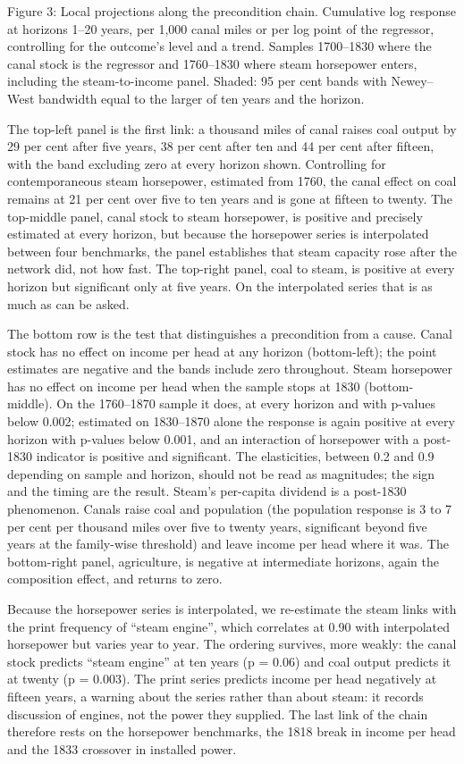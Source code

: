 \documentclass[
  11pt,
]{article}
\begin{document}
Figure 3: Local projections along the precondition chain. Cumulative log
response at horizons 1--20 years, per 1,000 canal miles or per log point
of the regressor, controlling for the outcome's level and a trend.
Samples 1700--1830 where the canal stock is the regressor and 1760--1830
where steam horsepower enters, including the steam-to-income panel.
Shaded: 95 per cent bands with Newey--West bandwidth equal to the larger
of ten years and the horizon.

The top-left panel is the first link: a thousand miles of canal raises
coal output by 29 per cent after five years, 38 per cent after ten and
44 per cent after fifteen, with the band excluding zero at every horizon
shown. Controlling for contemporaneous steam horsepower, estimated from
1760, the canal effect on coal remains at 21 per cent over five to ten
years and is gone at fifteen to twenty. The top-middle panel, canal
stock to steam horsepower, is positive and precisely estimated at every
horizon, but because the horsepower series is interpolated between four
benchmarks, the panel establishes that steam capacity rose after the
network did, not how fast. The top-right panel, coal to steam, is
positive at every horizon but significant only at five years. On the
interpolated series that is as much as can be asked.

The bottom row is the test that distinguishes a precondition from a
cause. Canal stock has no effect on income per head at any horizon
(bottom-left); the point estimates are negative and the bands include
zero throughout. Steam horsepower has no effect on income per head when
the sample stops at 1830 (bottom-middle). On the 1760--1870 sample it
does, at every horizon and with p-values below 0.002; estimated on
1830--1870 alone the response is again positive at every horizon with
p-values below 0.001, and an interaction of horsepower with a post-1830
indicator is positive and significant. The elasticities, between 0.2 and
0.9 depending on sample and horizon, should not be read as magnitudes;
the sign and the timing are the result. Steam's per-capita dividend is a
post-1830 phenomenon. Canals raise coal and population (the population
response is 3 to 7 per cent per thousand miles over five to twenty
years, significant beyond five years at the family-wise threshold) and
leave income per head where it was. The bottom-right panel, agriculture,
is negative at intermediate horizons, again the composition effect, and
returns to zero.

Because the horsepower series is interpolated, we re-estimate the steam
links with the print frequency of ``steam engine'', which correlates at
0.90 with interpolated horsepower but varies year to year. The ordering
survives, more weakly: the canal stock predicts ``steam engine'' at ten
years (p = 0.06) and coal output predicts it at twenty (p = 0.003). The
print series predicts income per head negatively at fifteen years, a
warning about the series rather than about steam: it records discussion
of engines, not the power they supplied. The last link of the chain
therefore rests on the horsepower benchmarks, the 1818 break in income
per head and the 1833 crossover in installed power.
\end{document}
